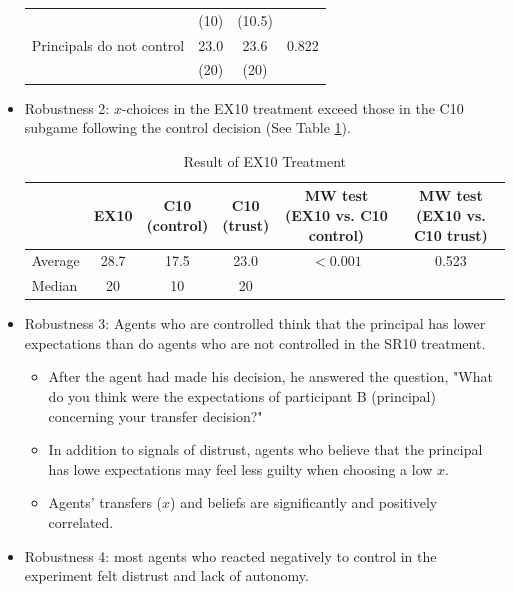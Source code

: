 \documentclass[../root]{subfiles}
\begin{document}
\begin{itemize}
\begin{table}[h]
\begin{tabular}{lccc}
                &
                (10) &
                (10.5) \\
                Principals do not control &
                23.0 &
                23.6 &
                0.822 \\
                &
                (20) &
                (20) \\
                \hline
            \end{tabular}
        \end{table}
        \item Robustness 2: $x$-choices in the EX10 treatment exceed those in the C10 subgame following the control decision (See Table \ref{robust2}).
        \begin{table}[h]
            \centering
            \caption{Result of EX10 Treatment}
            \label{robust2}
            \begin{tabular}{lccccc}
                \hline
                &
                EX10 &
                \dlinecell{C10 \\ (control)} &
                \dlinecell{C10 \\ (trust)} &
                \dlinecell{MW test \\ (EX10 vs. C10 control)}  &
                \dlinecell{MW test \\ (EX10 vs. C10 trust)}  \\
                \hline 
                Average &
                28.7 &
                17.5 &
                23.0 &
                $<0.001$ &
                0.523 \\
                Median &
                20 &
                10 &
                20 &
                & \\
                \hline
            \end{tabular}
        \end{table}
        \item Robustness 3: Agents who are controlled think that the principal has lower expectations than do agents who are not controlled in the SR10 treatment.
        \begin{itemize}
            \item After the agent had made his decision, he answered the question, "What do you think were the expectations of participant B (principal) concerning your transfer decision?"
            \item In addition to signals of distrust, agents who believe that the principal has lowe expectations may feel less guilty when choosing a low $x$.
            \item Agents' transfers ($x$) and beliefs are significantly and positively correlated.
        \end{itemize}
        \item Robustness 4: most agents who reacted negatively to control in the experiment felt distrust and lack of autonomy.
    \end{itemize}
\end{document}
